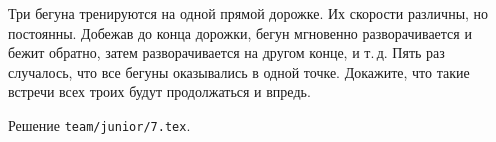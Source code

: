 \problem{}
Три бегуна тренируются на одной прямой дорожке.
Их скорости различны, но постоянны.
Добежав до конца дорожки, бегун мгновенно разворачивается и бежит обратно,
затем разворачивается на другом конце, и т.\,д.
Пять раз случалось, что все бегуны оказывались в одной точке.
Докажите, что такие встречи всех троих будут продолжаться и впредь.

\solution Решение \texttt{team/junior/7.tex}.
\endproblem
